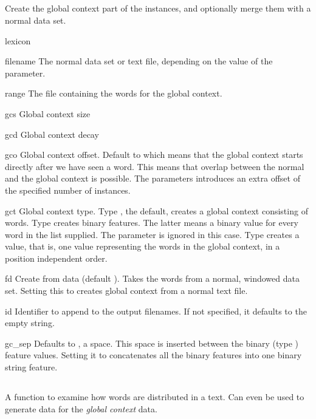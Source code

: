 \documentclass[a4paper,10pt,twoside]{report}
\begin{document}
\subsection{}

Create the global context part of the instances, and optionally merge
them with a normal data set.

\begin{varlist}{lexicon}
\item[filename] The normal data set or text file, depending on the
  value of the  parameter.
\item[range] The file containing the words for the global context.
\item[gcs] Global context size
\item[gcd] Global context decay
\item[gco] Global context offset. Default to  which means that
  the global context starts directly after we have seen a word. This
  means that overlap between the normal and the global context is
  possible. The  parameters introduces an extra offset of the
  specified number of instances. 
\item[gct] Global context type. Type , the default, creates a
  global context consisting of words. Type  creates binary
  features. The latter means a binary value for every word in the
   list supplied. The  parameter is ignored in
  this case. Type  creates a  value, that is, one
  value representing the words in the global context, in a position
  independent order.
\item[fd] Create from data (default ). Takes the words from a
  normal, windowed data set. Setting this to  creates global
  context from a normal text file.
\item[id] Identifier to append to the output filenames. If not
  specified, it defaults to the empty string.
\item[gc\_sep] Defaults to , a space. This space is inserted
  between the binary (type ) feature values. Setting it to
   concatenates all the binary features into one binary string
  feature. 
\end{varlist}

\subsection{}

A function to examine how words are distributed in a text. Can even be
used to generate data for the \emph{global context} data.
\end{document}
